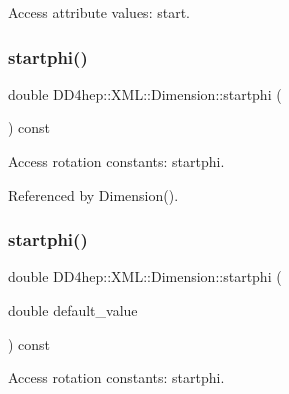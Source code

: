 Access attribute values\+: start. 

\hypertarget{struct_d_d4hep_1_1_x_m_l_1_1_dimension_aa5f72a15e55b2a7708d55171af03b43e}{}\label{struct_d_d4hep_1_1_x_m_l_1_1_dimension_aa5f72a15e55b2a7708d55171af03b43e} 
\subsubsection{\texorpdfstring{startphi()}{startphi()}\hspace{0.1cm}{\footnotesize\ttfamily [1/2]}}
{\footnotesize\ttfamily double D\+D4hep\+::\+X\+M\+L\+::\+Dimension\+::startphi (\begin{DoxyParamCaption}{ }\end{DoxyParamCaption}) const}



Access rotation constants\+: startphi. 



Referenced by Dimension().

\hypertarget{struct_d_d4hep_1_1_x_m_l_1_1_dimension_a7d5e7d17330c5f350b5025e31b0efbdf}{}\label{struct_d_d4hep_1_1_x_m_l_1_1_dimension_a7d5e7d17330c5f350b5025e31b0efbdf} 
\subsubsection{\texorpdfstring{startphi()}{startphi()}\hspace{0.1cm}{\footnotesize\ttfamily [2/2]}}
{\footnotesize\ttfamily double D\+D4hep\+::\+X\+M\+L\+::\+Dimension\+::startphi (\begin{DoxyParamCaption}\item[{double}]{default\+\_\+value }\end{DoxyParamCaption}) const}



Access rotation constants\+: startphi. 

\hypertarget{struct_d_d4hep_1_1_x_m_l_1_1_dimension_ad283054d5d690865227f202982aa46a7}{}\label{struct_d_d4hep_1_1_x_m_l_1_1_dimension_ad283054d5d690865227f202982aa46a7} 
